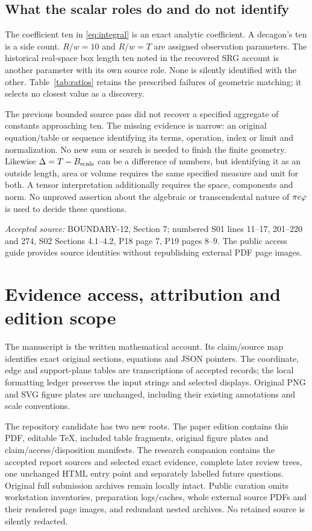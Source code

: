 \documentclass[11pt,a4paper]{article}
\newcommand{\source}[1]{\par{\small\emph{Accepted source:} #1}\par}
\begin{document}
\subsection{What the scalar roles do and do not identify}
The coefficient ten in \eqref{eq:integral} is an exact analytic coefficient. A decagon's ten is a side count. $R/w=10$ and $R/w=T$ are assigned observation parameters. The historical real-space box length ten noted in the recovered SRG account is another parameter with its own source role. None is silently identified with the other. Table~\ref{tab:ratios} retains the prescribed failures of geometric matching; it selects no closest value as a discovery.

The previous bounded source pass did not recover a specified aggregate of constants approaching ten. The missing evidence is narrow: an original equation/table or sequence identifying its terms, operation, index or limit and normalization. No new sum or search is needed to finish the finite geometry. Likewise $\Delta=T-B_{\rm scale}$ can be a difference of numbers, but identifying it as an outside length, area or volume requires the same specified measure and unit for both. A tensor interpretation additionally requires the space, components and norm. No unproved assertion about the algebraic or transcendental nature of $\pi e\varphi$ is used to decide these questions.
\source{BOUNDARY-12, Section 7; numbered S01 lines 11--17, 201--220 and 274, S02 Sections 4.1--4.2, P18 page 7, P19 pages 8--9. The public access guide provides source identities without republishing external PDF page images.}

\clearpage\section{Evidence access, attribution and edition scope}\label{app:evidence}
The manuscript is the written mathematical account. Its claim/source map identifies exact original sections, equations and JSON pointers. The coordinate, edge and support-plane tables are transcriptions of accepted records; the local formatting ledger preserves the input strings and selected displays. Original PNG and SVG figure plates are unchanged, including their existing annotations and scale conventions.

The repository candidate has two new roots. The paper edition contains this PDF, editable TeX, included table fragments, original figure plates and claim/access/disposition manifests. The research companion contains the accepted report sources and selected exact evidence, complete later review trees, one unchanged HTML entry point and separately labelled future questions. Original full submission archives remain locally intact. Public curation omits workstation inventories, preparation logs/caches, whole external source PDFs and their rendered page images, and redundant nested archives. No retained source is silently redacted.
\end{document}
